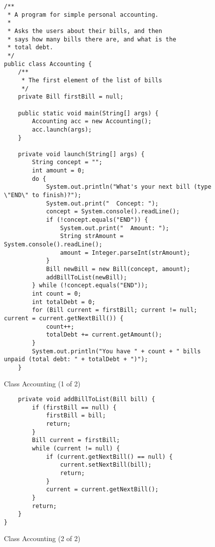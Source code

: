 \documentclass{article}
\begin{document}
\begin{figure}[hbtp]
  \centering
\begin{verbatim}
/**
 * A program for simple personal accounting. 
 *
 * Asks the users about their bills, and then 
 * says how many bills there are, and what is the
 * total debt.
 */
public class Accounting {
    /**
     * The first element of the list of bills
     */
    private Bill firstBill = null;

    public static void main(String[] args) {
        Accounting acc = new Accounting();
        acc.launch(args);
    }

    private void launch(String[] args) {
        String concept = "";
        int amount = 0;
        do {
            System.out.println("What's your next bill (type \"END\" to finish)?");
            System.out.print("  Concept: "); 
            concept = System.console().readLine();
            if (!concept.equals("END")) {
                System.out.print("  Amount: "); 
                String strAmount = System.console().readLine();
                amount = Integer.parseInt(strAmount);
            }
            Bill newBill = new Bill(concept, amount);
            addBillToList(newBill);
        } while (!concept.equals("END"));
        int count = 0;
        int totalDebt = 0;
        for (Bill current = firstBill; current != null; current = current.getNextBill()) {
            count++;
            totalDebt += current.getAmount();
        }
        System.out.println("You have " + count + " bills unpaid (total debt: " + totalDebt + ")");
    }
\end{verbatim}
  \caption{Class Accounting (1 of 2)}
  \label{fig:accountingggggt}
\end{figure}

\begin{figure}[hbtp]
  \centering
\begin{verbatim}
    private void addBillToList(Bill bill) {
        if (firstBill == null) {
            firstBill = bill;
            return;
        } 
        Bill current = firstBill;
        while (current != null) {
            if (current.getNextBill() == null) {
                current.setNextBill(bill);
                return;
            }
            current = current.getNextBill();
        }
        return;
    }
}
\end{verbatim}
  \caption{Class Accounting (2 of 2)}
  \label{fig:accountinggggg}
\end{figure}
\end{document}
